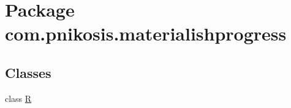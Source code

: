 \hypertarget{namespacecom_1_1pnikosis_1_1materialishprogress}{}\section{Package com.\+pnikosis.\+materialishprogress}
\label{namespacecom_1_1pnikosis_1_1materialishprogress}
\subsection*{Classes}
\begin{DoxyCompactItemize}
\item 
class \hyperlink{classcom_1_1pnikosis_1_1materialishprogress_1_1_r}{R}
\end{DoxyCompactItemize}
